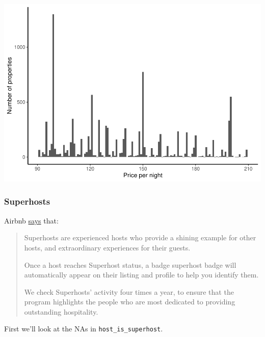 \documentclass[
]{book}
\newenvironment{Shaded}{\begin{snugshade}}{\end{snugshade}}
\newcommand{\KeywordTok}[1]{\textcolor[rgb]{0.13,0.29,0.53}{\textbf{#1}}}
\newcommand{\NormalTok}[1]{#1}
\newcommand{\OperatorTok}[1]{\textcolor[rgb]{0.81,0.36,0.00}{\textbf{#1}}}
\newcommand{\StringTok}[1]{\textcolor[rgb]{0.31,0.60,0.02}{#1}}
\begin{document}
\includegraphics{telling_stories_with_data_files/figure-latex/unnamed-chunk-307-1.pdf}

\hypertarget{superhosts}{%
\subsubsection{Superhosts}\label{superhosts}}

Airbnb \href{https://www.airbnb.ca/help/article/828/what-is-a-superhost}{says} that:

\begin{quote}
Superhosts are experienced hosts who provide a shining example for other hosts, and extraordinary experiences for their guests.

Once a host reaches Superhost status, a badge superhost badge will automatically appear on their listing and profile to help you identify them.

We check Superhosts' activity four times a year, to ensure that the program highlights the people who are most dedicated to providing outstanding hospitality.
\end{quote}

First we'll look at the NAs in \texttt{host\_is\_superhost}.

\begin{Shaded}
\end{Shaded}
\end{document}

